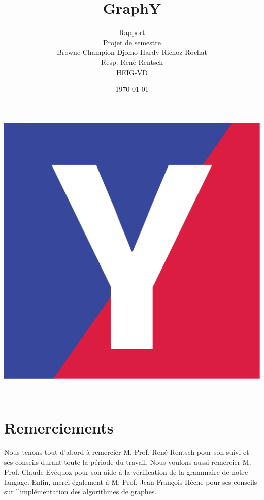 \documentclass[french]{article}
\begin{document}
	
	
	\title{GraphY} %
	\author{Rapport\\ 
		Projet de semestre\\
		Browne Champion Djomo Hardy Richoz Rochat\\
		Resp. René Rentsch\\
		HEIG-VD}
	\date{\today} %
	\maketitle
	\vspace{2cm}
	\centering
	\includegraphics[scale=0.3]{Maquette/favicon.pdf}
	\thispagestyle{empty}
	
	\newpage
	\thispagestyle{empty}
	$ $
	\newpage
	
	\justify
	\normalsize
	
	\tableofcontents
	
	\newpage
	
	\section*{Remerciements}
	Nous tenons tout d'abord à remercier M. Prof. René Rentsch pour son suivi et ses conseils durant toute la période du travail. Nous voulons aussi remercier M. Prof. Claude Evéquoz pour son aide à la vérification de la grammaire de notre langage. Enfin, merci également à M. Prof. Jean-François Hêche pour ses conseils sur l'implémentation des algorithmes de graphes.
	
\end{document}

